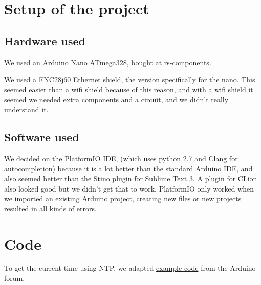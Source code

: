 \documentclass{article}
\begin{document}
	\section{Setup of the project}
	\subsection{Hardware used}
	We used an Arduino Nano ATmega328, bought at \href{http://nl.rs-online.com/}{rs-components}.
	
	We used a \href{http://www.mijn-gadgets.nl/Webwinkel-Product-157562595/ENC28J60-Ethernet-Shield-Network-Module-V1.0-For-Arduino-Nano.html}{ENC28j60 Ethernet shield}, the version specifically for the nano. This seemed easier than a wifi shield because of this reason, and with a wifi shield it seemed we needed extra components and a circuit, and we didn't really understand it.
	\subsection{Software used}
	We decided on the \href{http://platformio.org/platformio-ide}{PlatformIO IDE}, (which uses python 2.7 and Clang for autocompletion) because it is a lot better than the standard Arduino IDE, and also seemed better than the Stino plugin for Sublime Text 3. A plugin for CLion also looked good but we didn't get that to work. PlatformIO only worked when we imported an existing Arduino project, creating new files or new projects resulted in all kinds of errors.
	
	\section{Code}
	
	To get the current time using NTP, we adapted \href{http://forum.arduino.cc/index.php?topic=171941.0}{example code} from the Arduino forum.
	
	
\end{document}
